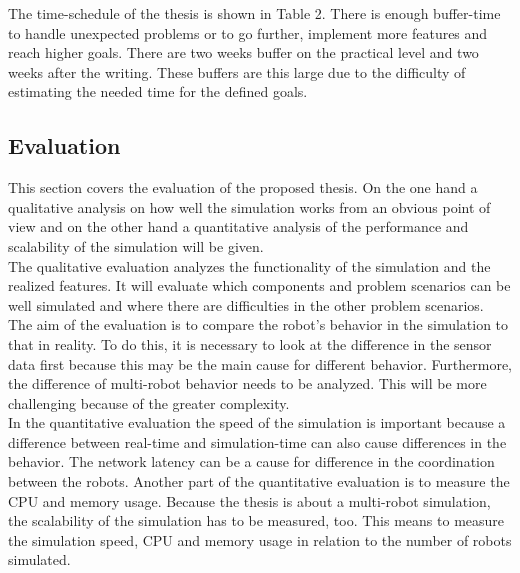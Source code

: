 \documentclass[a4paper,11pt]{article}
\begin{document}
The time-schedule of the thesis is shown in Table 2. There is enough buffer-time to handle unexpected problems or to go further, implement more features and reach higher goals. There are two weeks buffer on the practical level and two weeks after the writing. These buffers are this large due to the difficulty of estimating the needed time for the defined goals.

\subsection{Evaluation}
This section covers the evaluation of the proposed thesis. On the one hand a qualitative analysis on how well the simulation works from an obvious point of view and on the other hand a quantitative analysis of the performance and scalability of the simulation will be given.\\
The qualitative evaluation analyzes the functionality of the simulation and the realized features. It will evaluate which components and problem scenarios can be well simulated and where there are difficulties in the other problem scenarios. The aim of the evaluation is to compare the robot's behavior in the simulation to that in reality. To do this, it is necessary to look at the difference in the sensor data first because this may be the main cause for different behavior. Furthermore, the difference of multi-robot behavior needs to be analyzed. This will be more challenging because of the greater complexity.\\
In the quantitative evaluation the speed of the simulation is important because a difference between real-time and simulation-time can also cause differences in the behavior. The network latency can be a cause for difference in the coordination between the robots. Another part of the quantitative evaluation is to measure the CPU and memory usage. Because the thesis is about a multi-robot simulation, the scalability of the simulation has to be measured, too. This means to measure the simulation speed, CPU and memory usage in relation to the number of robots simulated.
\end{document}
